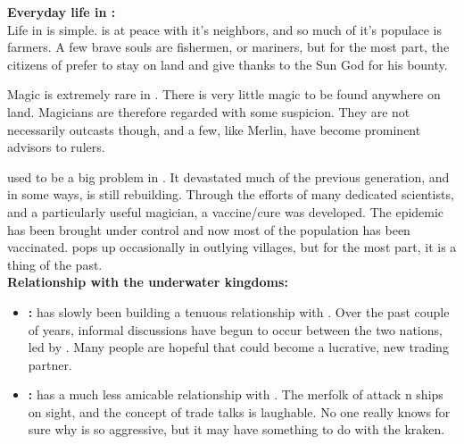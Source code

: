 \documentclass[blue]{NeptuneBall}
\begin{document}
{\bf Everyday life in \pAmerica{}:}\\
Life in \pAmerica{} is simple. \pAmerica{} is at peace with it's neighbors, and so much of it's populace is farmers. A few brave souls are fishermen, or mariners,  but for the most part, the citizens of \pAmerica{} prefer to stay on land and give thanks to the Sun God for his bounty.

Magic is extremely rare in \pAmerica{}. There is very little magic to be found anywhere on land. Magicians are therefore regarded with some suspicion. They are not necessarily outcasts though, and a few, like Merlin, have become prominent advisors to rulers.

\cPolio{} used to be a big problem in \pAmerica{}. It devastated much of the previous generation, and in some ways, \pAmerica{} is still rebuilding. Through the efforts of many dedicated scientists, and a particularly useful magician, a vaccine/cure was developed. The epidemic has been brought under control and now most of the population has been vaccinated. \cPolio{} pops up occasionally in outlying villages, but for the most part, it is a thing of the past.\\

{\bf Relationship with the underwater kingdoms:}\\
\begin{itemize}
  \item {\bf \pAtlantis{}:} \pAmerica{} has slowly been building a tenuous relationship with \pAtlantis{}. Over the past couple of years, informal discussions  have begun to occur between the two nations, led by \cAriel{\King} \cAriel{}. Many people are hopeful that \pAtlantis{} could become a lucrative, new trading partner.
  \item {\bf \pPacifica{}:} \pAmerica{} has a much less amicable relationship with \pPacifica{}. The merfolk of \pPacifica{} attack \pAmerica{}n ships on sight, and the concept of trade talks is laughable. No one really knows for sure why \pPacifica{} is so aggressive, but it may have something to do with the kraken.
\end{itemize}
\end{document}

